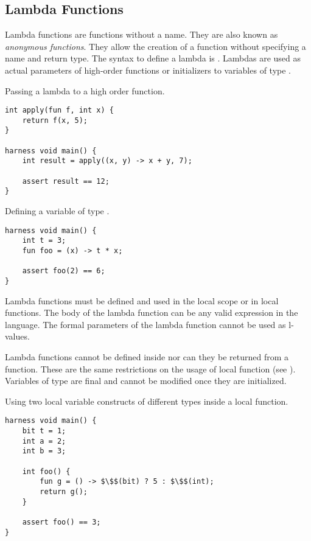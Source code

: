 \subsection{Lambda Functions}

Lambda functions are functions without a name. They are also known as \textit{anonymous functions}. They allow the creation of a function without specifying a name and return type. The syntax to define a lambda is . Lambdas are used as actual parameters of high-order functions or initializers to variables of type .

\begin{Example}
Passing a lambda to a high order function.
\begin{lstlisting}
int apply(fun f, int x) {
    return f(x, 5);
}

harness void main() {  
    int result = apply((x, y) -> x + y, 7);
         
    assert result == 12; 
}
\end{lstlisting}

\end{Example}

\begin{Example}
Defining a variable of type .
\begin{lstlisting}
harness void main() {     
    int t = 3;
    fun foo = (x) -> t * x;
            
    assert foo(2) == 6; 
}
\end{lstlisting}

\end{Example}

Lambda functions must be defined and used in the local scope or in local functions. The body of the lambda function can be any valid expression in the language. The formal parameters of the lambda function cannot be used as l-values.

Lambda functions cannot be defined inside  nor can they be returned from a function. These are the same restrictions on the usage of local function (see ). Variables of type  are final and cannot be modified once they are initialized.

\begin{Example}
Using two local variable constructs of different types inside a local function.
\begin{lstlisting}
harness void main() {  
    bit t = 1;    
    int a = 2;
    int b = 3;
    
    int foo() {
        fun g = () -> $\$$(bit) ? 5 : $\$$(int);
        return g();
    }

    assert foo() == 3;
}
\end{lstlisting}

\end{Example}


